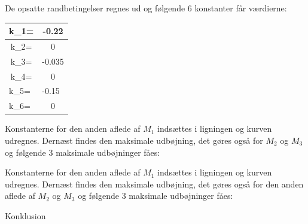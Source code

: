De opsatte randbetingelser regnes ud og følgende 6 konstanter får værdierne: 

\begin{table}[h]
	\begin{tabular}{|c|c|}
		\hline
		k\_1= & -0.22                      \\ \hline
		k\_2= & 0                          \\ \hline
		k\_3= & -0.035                     \\ \hline
		k\_4= & 0                          \\ \hline
		\multicolumn{1}{|l|}{k\_5=} & \multicolumn{1}{l|}{-0.15} \\ \hline
		\multicolumn{1}{|l|}{k\_6=} & 0                          \\ \hline
	\end{tabular}
\end{table}

Konstanterne for den anden aflede af $M_1$ indsættes i ligningen og kurven udregnes. Dernæst findes den maksimale udbøjning, det gøres også for $M_2$ og $M_3$ og følgende 3 maksimale udbøjninger fåes: 

Konstanterne for den anden aflede af $M_1$ indsættes i ligningen og kurven udregnes. Dernæst findes den maksimale udbøjning, det gøres også for den anden aflede af $M_2$ og $M_3$ og følgende 3 maksimale udbøjninger fåes: 



Konklusion